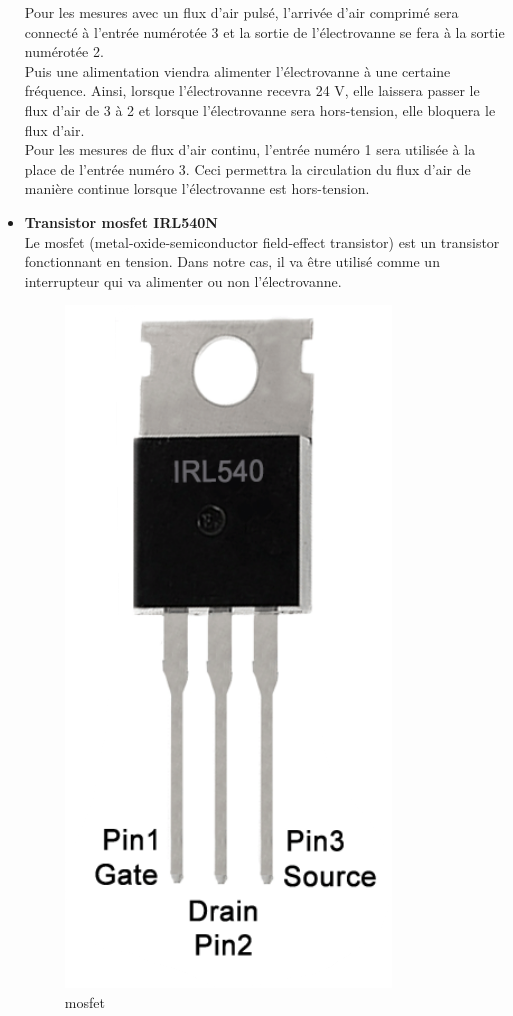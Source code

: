 \begin{itemize}
          Pour les mesures avec un flux d'air pulsé, l'arrivée d'air comprimé sera connecté à l'entrée numérotée 3 et la sortie de l'électrovanne se fera à 
          la sortie numérotée 2. \\
          Puis une alimentation viendra alimenter l'électrovanne à une certaine fréquence. Ainsi, lorsque l'électrovanne recevra 24 V, elle laissera 
          passer le flux d'air de 3 à 2 et lorsque l'électrovanne sera hors-tension, elle bloquera le flux d'air. \\
          
          Pour les mesures de flux d'air continu, l'entrée numéro 1 sera utilisée à la place de l'entrée numéro 3. Ceci permettra la circulation du 
          flux d'air de manière continue lorsque l'électrovanne est hors-tension. \\
          
    \item \textbf{Transistor \gls{mosfet} IRL540N}\\
          Le \gls{mosfet} (metal-oxide-semiconductor field-effect transistor) est un transistor fonctionnant en tension. Dans notre cas, il va
          être utilisé comme un interrupteur qui va alimenter ou non l'électrovanne.
          \begin{figure}[H]
              \centering
              \includegraphics[scale = 0.3]{assets/figures/mosfet_visuel.png}
              \caption{\gls{mosfet}}
              \label{fig:mosfet}
          \end{figure}
          

\end{itemize}
